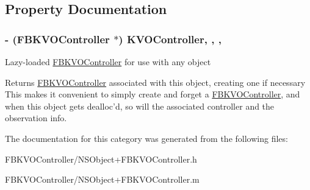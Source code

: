\subsection{Property Documentation}
\hypertarget{category_n_s_object_07_f_b_k_v_o_controller_08_aa95ad60ae38e9a30b495e54faedeed23}{
\subsubsection[{K\+V\+O\+Controller}]{\setlength{\rightskip}{0pt plus 5cm}-\/ ({\bf F\+B\+K\+V\+O\+Controller} $\ast$) K\+V\+O\+Controller\hspace{0.3cm}{\ttfamily [read]}, {\ttfamily [write]}, {\ttfamily [nonatomic]}, {\ttfamily [strong]}}}\label{category_n_s_object_07_f_b_k_v_o_controller_08_aa95ad60ae38e9a30b495e54faedeed23}
Lazy-\/loaded \hyperlink{interface_f_b_k_v_o_controller}{F\+B\+K\+V\+O\+Controller} for use with any object \begin{DoxyReturn}{Returns}
\hyperlink{interface_f_b_k_v_o_controller}{F\+B\+K\+V\+O\+Controller} associated with this object, creating one if necessary  This makes it convenient to simply create and forget a \hyperlink{interface_f_b_k_v_o_controller}{F\+B\+K\+V\+O\+Controller}, and when this object gets dealloc'd, so will the associated controller and the observation info. 
\end{DoxyReturn}


The documentation for this category was generated from the following files\+:\begin{DoxyCompactItemize}
\item 
F\+B\+K\+V\+O\+Controller/N\+S\+Object+\+F\+B\+K\+V\+O\+Controller.\+h\item 
F\+B\+K\+V\+O\+Controller/N\+S\+Object+\+F\+B\+K\+V\+O\+Controller.\+m\end{DoxyCompactItemize}
